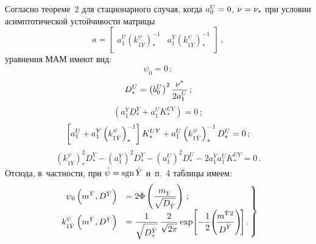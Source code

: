 \begin{multicols}{2}
{Согласно теореме~2 для стационарного случая, когда  $a_0^U \hm=0$, $\nu\hm=\nu_*$ 
при условии асимптотической устойчи\-вости матрицы
    \begin{equation*}
    a=\begin{bmatrix}
    a_1^U\left(k_{1\dot Y}^\psi\right)^{-1}_*& a_1^Y\left(k_{1\dot Y}^\psi\right)^{-1}_*
    \end{bmatrix}\,,
     \end{equation*}
уравнения МАМ имеют вид:
    \begin{equation}
    \psi_0 =0\,; \label{p7}
    \end{equation}
    \begin{equation}
    D_*^U =\left(b_0^U\right)^2 \displaystyle\frac{\displaystyle \nu^*\mathstrut}{\displaystyle 2 a_1^U\mathstrut}\,;
    \label{p8}
    \end{equation}
    \begin{equation}
    \left(a_1^Y D_*^Y + a_1^U K_*^{UY}\right)=0\,; 
    \label{p9}
    \end{equation}
    \begin{equation}
    \left[ a_1^U+ a_1^Y \left(k_{1\dot Y}^\psi\right)^{-1}_*\right] K_*^{UY} +  
    a_1^U\left(k_{1\dot Y}^\psi\right)^{-1}_* D_*^U =0\,; 
    \label{p10}
    \end{equation}
    \begin{equation*}
    \left(k_{1\dot Y}^\psi\right)^{2}_* D_*^{\dot Y} -\left(a_1^Y\right)^2 D_*^Y - 
    \left(a_1^U\right)^2 D_*^U - 2 a_1^Y a_1^U K_*^{UY}=0\,. 
    \end{equation*}
Отсюда, в~частности, при  $\dot \psi \hm= \mathrm{sgn}\, \dot Y$ и~п.~4 таблицы 
имеем:
        \begin{equation}
        \left.
        \begin{array}{rl}
          \hspace*{-2mm} \psi_0 \left(m^{\dot Y}, D^{\dot Y}\right)& =2 \Phi \left(\fr{m_{\dot Y}}{\sqrt{D_{\dot Y}}}
    \right)\,; \\[6pt]
             \hspace*{-2mm} k_{1\dot Y}^\psi \left(m^{\dot Y}, D^{\dot Y}\right) &= 
    \fr{1}{\sqrt{D_*^{\dot Y}  }}\,\fr{2}{\sqrt{2\pi}} \exp\! \lk - 
    \fr{1}{2} \! \left(\!\fr{m^{\dot Y 2}}{D^{\dot Y}}\right)\! \rk.
    \end{array}\!\!
    \right\}\!\!
    \label{p12}
        \end{equation}

}
\end{multicols}
